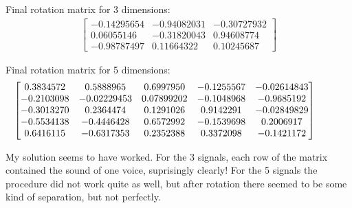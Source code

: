 \documentclass[12pt]{article}
\begin{document}
Final rotation matrix for 3 dimensions:
\begin{align*}
\begin{bmatrix}
  -0.14295654 & -0.94082031 & -0.30727932 \\
  0.06055146 & -0.31820043 & 0.94608774 \\
  -0.98787497 & 0.11664322 & 0.10245687
\end{bmatrix}
\end{align*}

Final rotation matrix for 5 dimensions:
\begin{align*}
\hspace{-1cm}
\begin{bmatrix}
0.3834572	&0.5888965&	0.6997950	&-0.1255567&	-0.02614843\\
-0.2103098&	-0.02229453	&0.07899202	&-0.1048968&	-0.9685192\\
-0.3013270&	0.2364474&	0.1291026	&0.9142291	&-0.02849829\\
-0.5534138&	-0.4446428&	0.6572992	&-0.1539698&	0.2006917\\
0.6416115&	-0.6317353&	0.2352388	&0.3372098	&-0.1421172
\end{bmatrix}
\end{align*}

My solution seems to have worked. For the 3 signals, each row of the matrix contained the sound of one voice, suprisingly clearly! For the 5 signals the procedure did not work quite as well, but after rotation there seemed to be some kind of separation, but not perfectly.
\end{document}
